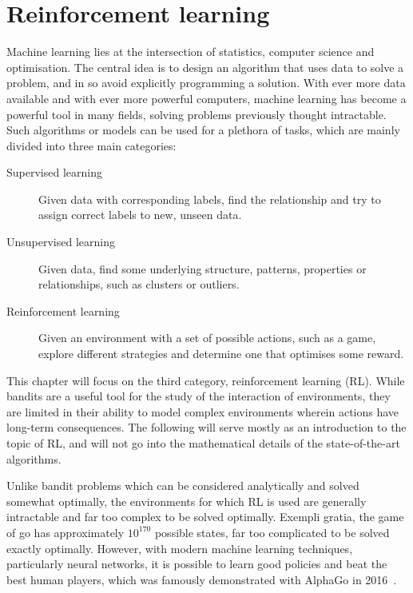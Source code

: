 \chapter{Reinforcement learning}
\label{chap:rl}

Machine learning lies at the intersection of statistics, computer science and optimisation.
The central idea is to design an algorithm that uses data to solve a problem, and in so avoid explicitly programming a solution.
With ever more data available and with ever more powerful computers, machine learning has become a powerful tool in many fields, solving problems previously thought intractable.
Such algorithms or models can be used for a plethora of tasks, which are mainly divided into three main categories:
\begin{description}

    \item[Supervised learning]
        Given data with corresponding labels, find the relationship and try to assign correct labels to new, unseen data.

    \item[Unsupervised learning]
        Given data, find some underlying structure, patterns, properties or relationships, such as clusters or outliers.

    \item[Reinforcement learning]
        Given an environment with a set of possible actions, such as a game, explore different strategies and determine one that optimises some reward.

\end{description}

This chapter will focus on the third category, reinforcement learning (RL).
While bandits are a useful tool for the study of the interaction of environments, they are limited in their ability to model complex environments wherein actions have long-term consequences.
The following will serve mostly as an introduction to the topic of RL, and will not go into the mathematical details of the state-of-the-art algorithms.

Unlike bandit problems which can be considered analytically and solved somewhat optimally, the environments for which RL is used are generally intractable and far too complex to be solved optimally.
Exempli gratia, the game of go has approximately $10^{170}$ possible states, far too complicated to be solved exactly optimally.
However, with modern machine learning techniques, particularly neural networks, it is possible to learn good policies and beat the best human players, which was famously demonstrated with AlphaGo in 2016~\autocite{silver2016}.

